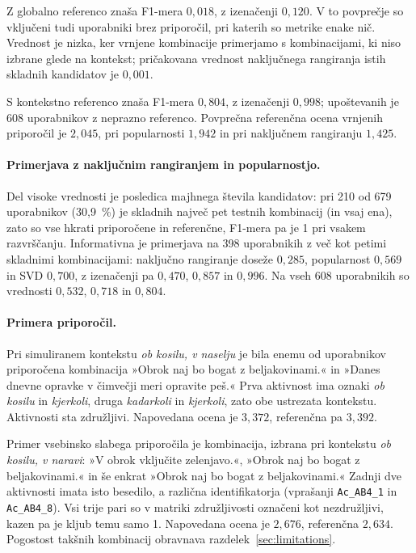 \documentclass[a4paper,twoside,openright,12pt,slovene]{book}
\begin{document}
Z globalno referenco znaša F1-mera $0{,}018$, z izenačenji
$0{,}120$. V to povprečje so vključeni tudi uporabniki
brez priporočil, pri katerih so metrike enake nič.
Vrednost je nizka, ker vrnjene kombinacije primerjamo s kombinacijami,
ki niso izbrane glede na kontekst; pričakovana vrednost naključnega
rangiranja istih skladnih kandidatov je $0{,}001$.

S kontekstno referenco znaša F1-mera $0{,}804$, z izenačenji
$0{,}998$; upoštevanih je 608 uporabnikov z neprazno
referenco. Povprečna referenčna ocena vrnjenih priporočil
je $2{,}045$, pri popularnosti $1{,}942$ in pri naključnem
rangiranju $1{,}425$.



\paragraph{Primerjava z naključnim rangiranjem in popularnostjo.}
Del visoke vrednosti je posledica majhnega števila kandidatov:
pri 210 od 679 uporabnikov (30,9~\%) je skladnih največ pet
testnih kombinacij (in vsaj ena), zato so vse hkrati priporočene
in referenčne, F1-mera pa je 1 pri vsakem razvrščanju. Informativna
je primerjava na 398 uporabnikih z več kot petimi skladnimi
kombinacijami: naključno rangiranje doseže $0{,}285$, popularnost
$0{,}569$ in SVD $0{,}700$, z izenačenji pa $0{,}470$, $0{,}857$
in $0{,}996$. Na vseh 608 uporabnikih so vrednosti
$0{,}532$, $0{,}718$ in $0{,}804$.

\paragraph{Primera priporočil.}
Pri simuliranem kontekstu \emph{ob kosilu, v naselju} je bila
enemu od uporabnikov priporočena kombinacija »Obrok naj bo bogat
z beljakovinami.« in »Danes dnevne opravke v čimvečji meri opravite
peš.« Prva aktivnost ima oznaki \emph{ob kosilu} in \emph{kjerkoli},
druga \emph{kadarkoli} in \emph{kjerkoli}, zato obe ustrezata kontekstu.
Aktivnosti sta združljivi. Napovedana ocena je $3{,}372$,
referenčna pa $3{,}392$.

Primer vsebinsko slabega priporočila je kombinacija, izbrana pri kontekstu
\emph{ob kosilu, v naravi}: »V obrok vključite zelenjavo.«,
»Obrok naj bo bogat z beljakovinami.« in še enkrat »Obrok naj bo bogat
z beljakovinami.« Zadnji dve aktivnosti imata isto besedilo, a
različna identifikatorja (vprašanji \texttt{Ac\_AB4\_1} in
\texttt{Ac\_AB4\_8}). Vsi trije pari so v matriki združljivosti
označeni kot nezdružljivi, kazen pa je kljub temu samo 1. Napovedana
ocena je $2{,}676$, referenčna $2{,}634$. Pogostost takšnih
kombinacij obravnava razdelek~\ref{sec:limitations}.
\end{document}

